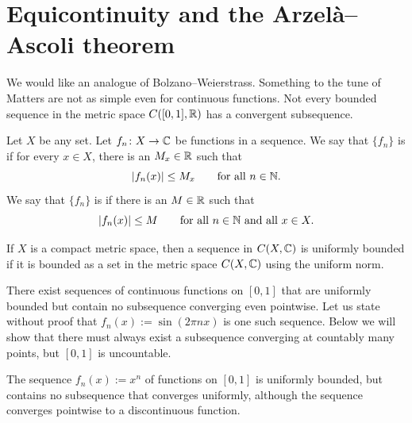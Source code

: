 
\sectionnewpage
\section{Equicontinuity and the Arzel\`a--Ascoli theorem}
\label{sec:arzelaascoli}


We would like an analogue of Bolzano--Weierstrass.  Something to the tune of
Matters are not
as simple even for continuous functions. 
Not every bounded sequence in the metric space $C([0,1],{\mathbb{R}})$ has
a convergent subsequence.

\begin{defn}
Let $X$ be any set.
Let $f_n \colon X \to {\mathbb{C}}$ be functions in a sequence.  We say that
$\{ f_n \}$
is \emph{} if for every $x \in X$, there is an $M_x \in {\mathbb{R}}$
such that
\begin{equation*}
\lvert {f_n(x)} \rvert \leq M_x \qquad \text{for all } n \in {\mathbb{N}} .
\end{equation*}
We say that
$\{ f_n \}$
is \emph{} if there is an $M \in {\mathbb{R}}$
such that
\begin{equation*}
\lvert {f_n(x)} \rvert \leq M \qquad \text{for all } n \in {\mathbb{N}} \text{ and all } x \in X.
\end{equation*}
\end{defn}

If $X$ is a compact metric space, then a sequence in $C(X,{\mathbb{C}})$
is uniformly bounded if it is bounded as a set in the metric space
$C(X,{\mathbb{C}})$ using the uniform norm.

\begin{example}
There exist sequences of 
continuous functions
on $[0,1]$ that are uniformly bounded but contain no subsequence converging
even pointwise.
Let us state without proof that $f_n(x) := \sin (2\pi n x)$ is one
such sequence.
Below we will show that there must always exist
a subsequence converging at countably
many points, but $[0,1]$ is uncountable.
\end{example}

\begin{example}
The sequence $f_n(x) := x^n$ of functions on $[0,1]$
is uniformly bounded, but contains no subsequence that converges
uniformly,
although the sequence converges pointwise to a discontinuous function.
\end{example}

